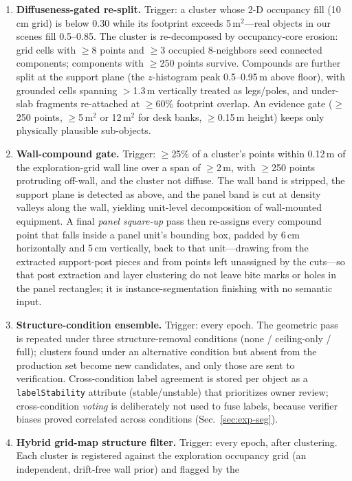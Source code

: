 \begin{enumerate}
\item \textbf{Diffuseness-gated re-split.} Trigger: a cluster whose 2-D
occupancy fill (10\,cm grid) is below 0.30 while its footprint exceeds
5\,m$^2$---real objects in our scenes fill 0.5--0.85. The cluster is
re-decomposed by occupancy-core erosion: grid cells with $\ge$8 points and
$\ge$3 occupied 8-neighbors seed connected components; components with
$\ge$250 points survive. Compounds are further split at the support plane
(the $z$-histogram peak 0.5--0.95\,m above floor), with grounded cells
spanning $>$1.3\,m vertically treated as legs/poles, and under-slab
fragments re-attached at $\ge$60\% footprint overlap. An evidence gate
($\ge$250 points, $\ge$5\,m$^2$ or 12\,m$^2$ for desk banks,
$\ge$0.15\,m height) keeps only physically plausible sub-objects.
\item \textbf{Wall-compound gate.} Trigger: $\ge$25\% of a cluster's
points within 0.12\,m of the exploration-grid wall line over a span of
$\ge$2\,m, with $\ge$250 points protruding off-wall, and the cluster not
diffuse. The wall band is stripped, the support plane is detected as
above, and the panel band is cut at density valleys along the wall,
yielding unit-level decomposition of wall-mounted equipment. A final
\emph{panel square-up} pass then re-assigns every compound point that
falls inside a panel unit's bounding box, padded by 6\,cm horizontally
and 5\,cm vertically, back to that unit---drawing from the extracted
support-post pieces and from points left unassigned by the cuts---so that
post extraction and layer clustering do not leave bite marks or holes in
the panel rectangles; it is instance-segmentation finishing with no
semantic input.
\item \textbf{Structure-condition ensemble.} Trigger: every epoch.
The geometric pass is repeated under three structure-removal conditions
(none / ceiling-only / full); clusters found under an alternative
condition but absent from the production set become new candidates, and
only those are sent to verification. Cross-condition label agreement is
stored per object as a \texttt{labelStability} attribute
(stable/unstable) that prioritizes owner review; cross-condition
\emph{voting} is deliberately not used to fuse labels, because verifier
biases proved correlated across conditions
(Sec.~\ref{sec:exp-seg}).
\item \textbf{Hybrid grid-map structure filter.} Trigger: every epoch,
after clustering. Each cluster is registered against the exploration
occupancy grid (an independent, drift-free wall prior) and flagged by the

\end{enumerate}
